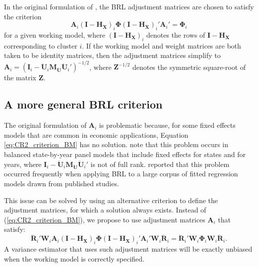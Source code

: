 \documentclass[12pt]{article}
\begin{document}
In the original formulation of \citet{Bell2002bias}, the BRL adjustment
matrices are chosen to satisfy the criterion \begin{equation}
\label{eq:CR2_criterion_BM}
\mathbf{A}_i \left(\mathbf{I} - \mathbf{H_X}\right)_i \boldsymbol\Phi \left(\mathbf{I} - \mathbf{H_X}\right)_i' \mathbf{A}_i'  =  \boldsymbol\Phi_i 
\end{equation} for a given working model, where
\(\left(\mathbf{I} - \mathbf{H_X}\right)_i\) denotes the rows of
\(\mathbf{I} - \mathbf{H_X}\) corresponding to cluster \(i\). If the
working model and weight matrices are both taken to be identity
matrices, then the adjustment matrices simplify to
\(\mathbf{A}_i = \left(\mathbf{I}_i - \mathbf{\ddot{U}}_i \mathbf{M_{\ddot{U}}} \mathbf{\ddot{U}}_i'\right)^{-1/2}\),
where \(\mathbf{Z}^{-1/2}\) denotes the symmetric square-root of the
matrix \(\mathbf{Z}\).

\hypertarget{a-more-general-brl-criterion}{%
\subsection{A more general BRL
criterion}\label{a-more-general-brl-criterion}}

The original formulation of \(\mathbf{A}_i\) is problematic because, for
some fixed effects models that are common in economic applications,
Equation \ref{eq:CR2_criterion_BM} has no solution.
\citet{Angrist2009mostly} note that this problem occurs in balanced
state-by-year panel models that include fixed effects for states and for
years, where
\(\mathbf{I}_i - \mathbf{\ddot{U}}_i \mathbf{M_{\ddot{U}}} \mathbf{\ddot{U}}_i'\)
is not of full rank. \citet{Young2016improved} reported that this
problem occurred frequently when applying BRL to a large corpus of
fitted regression models drawn from published studies.

This issue can be solved by using an alternative criterion to define the
adjustment matrices, for which a solution always exists. Instead of
(\ref{eq:CR2_criterion_BM}), we propose to use adjustment matrices
\(\mathbf{A}_i\) that satisfy: \begin{equation}
\label{eq:CR2_criterion}
\mathbf{\ddot{R}}_i' \mathbf{W}_i \mathbf{A}_i \left(\mathbf{I} - \mathbf{H_X}\right)_i \boldsymbol\Phi \left(\mathbf{I} - \mathbf{H_X}\right)_i' \mathbf{A}_i' \mathbf{W}_i \mathbf{\ddot{R}}_i = \mathbf{\ddot{R}}_i' \mathbf{W}_i \boldsymbol\Phi_i \mathbf{W}_i \mathbf{\ddot{R}}_i.
\end{equation} A variance estimator that uses such adjustment matrices
will be exactly unbiased when the working model is correctly specified.
\end{document}
